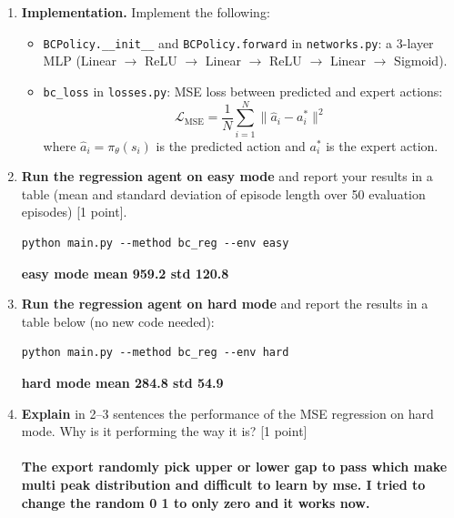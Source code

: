 \documentclass[12pt]{article}
\begin{document}
\begin{enumerate}

\item \textbf{Implementation.} Implement the following:
\begin{itemize}
    \item \texttt{BCPolicy.\_\_init\_\_} and \texttt{BCPolicy.forward} in \texttt{networks.py}: a 3-layer MLP (Linear $\to$ ReLU $\to$ Linear $\to$ ReLU $\to$ Linear $\to$ Sigmoid).
    \item \texttt{bc\_loss} in \texttt{losses.py}: MSE loss between predicted and expert actions:
    \begin{equation}
        \mathcal{L}_{\text{MSE}} = \frac{1}{N} \sum_{i=1}^{N} \| \hat{a}_i - a_i^* \|^2
    \end{equation}
    where $\hat{a}_i = \pi_\theta(s_i)$ is the predicted action and $a_i^*$ is the expert action.
\end{itemize}

\item \textbf{Run the regression agent on easy mode} and report your results in a table (mean and standard deviation of episode length over 50 evaluation episodes) [1 point].

\begin{tcolorbox}[width=\linewidth, sharp corners=all, colback=white!95!black]
\begin{verbatim}
python main.py --method bc_reg --env easy
\end{verbatim}
\end{tcolorbox}

\textbf{easy mode mean 959.2 std 120.8}


\item \textbf{Run the regression agent on hard mode} and report the results in a table below (no new code needed):

\begin{tcolorbox}[width=\linewidth, sharp corners=all, colback=white!95!black]
\begin{verbatim}
python main.py --method bc_reg --env hard
\end{verbatim}
\end{tcolorbox}

\textbf{hard mode mean 284.8 std 54.9}


\item \textbf{Explain} in 2--3 sentences the performance of the MSE regression on hard mode. Why is it performing the way it is? [1 point]\\
\\
\textbf{The export randomly pick upper or lower gap to pass which make multi peak distribution and difficult to learn by mse. I tried to change the random 0 1 to only zero and it works now.}
\end{enumerate}
\end{document}
